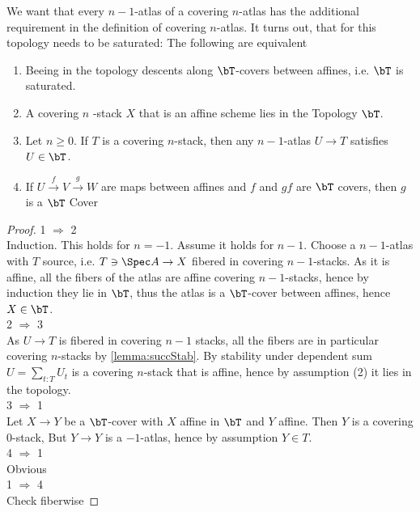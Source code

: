 \begin{lemma}[1.1]{\label{lemma:coveringatlas}}
	We want that every $n-1$-atlas of a covering $n$-atlas has the additional requirement in the definition of covering $n$-atlas. It turns out, that for this topology needs to be saturated:
	The following are equivalent
	\begin{enumerate}
		
		\item Beeing in the topology descents along $\bT$-covers between affines, i.e. $\bT$ is saturated.
		\item A covering $n$ -stack $X$ that is an affine scheme lies in the Topology $\bT$.  
		\item Let $n \ge 0$. If $T$ is a covering $n$-stack, then any $n-1$-atlas $U \to T$ satisfies $U \in \bT$.
		\item If $U \overset{f}{\to} V \overset{g}{\to} W$ are maps between affines and $f$ and $gf$ are $\bT$ covers, then $g$ is a $\bT$ Cover
	\end{enumerate}
\end{lemma}
\begin{proof}
	1 $\Rightarrow$ 2 \\
	Induction.
	This holds for $n=-1$. Assume it holds for $n-1$. Choose a $n-1$-atlas with $T$ source, i.e. $T \ni \Spec A \to X$ fibered in covering $n-1$-stacks.  As it is affine, all the fibers of the atlas are affine covering $n-1$-stacks, hence by induction they lie in $\bT$, thus the atlas is a $\bT$-cover between affines, hence $X \in \bT$. \\
	2 $\Rightarrow$ 3 \\
	As $U \to T$ is fibered in covering $n-1$ stacks, all the fibers are in particular covering $n$-stacks by \ref{lemma:succStab}. By stability under dependent sum $U = \sum_{t : T} U_t$ is a covering $n$-stack that is affine, hence by assumption (2) it lies in the topology.\\
	3 $\Rightarrow$ 1 \\
	Let $X \to Y$ be a $\bT$-cover with $X$ affine in $\bT$ and $Y$ affine. Then $Y$ is a covering $0$-stack, But $Y \to Y$ is a $-1$-atlas, hence by assumption $Y \in T$. 
	\\
	4 $\Rightarrow$ 1 \\
	Obvious
	\\
	1 $\Rightarrow$ 4 \\
	Check fiberwise
\end{proof}

